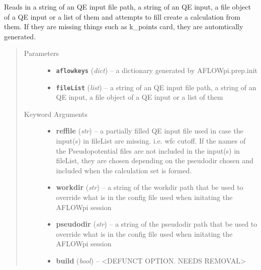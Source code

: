 \documentclass[letterpaper,10pt,english]{sphinxmanual}
\begin{document}
\begin{fulllineitems}
\label{prep:prep.calcFromFile}
Reads in a string of an QE input file path, a string of an QE input, a file object of a
QE input or a list of them and attempts to fill create a calculation from them. If they
are missing things such as k\_points card, they are automtically generated.
\begin{quote}\begin{description}
\item[{Parameters}] \leavevmode\begin{itemize}
\item {} 
\textbf{\texttt{aflowkeys}} (\emph{dict}) -- a dictionary generated by AFLOWpi.prep.init

\item {} 
\textbf{\texttt{fileList}} (\emph{list}) -- a string of an QE input file path, a string of an QE input, a file
object of a QE input or a list of them

\end{itemize}

\item[{Keyword Arguments}] \leavevmode\begin{itemize}
\item {} 
\textbf{reffile} (\emph{str}) --
a partially filled QE input file used in case the input(s) in fileList
are missing. i.e. wfc cutoff. If the names of the Pseudopotential files
are not included in the input(s) in fileList, they are chosen depending
on the pseudodir chosen and included when the calculation set is formed.

\item {} 
\textbf{workdir} (\emph{str}) --
a string of the workdir path that be used to override what is in the
config file used when initating the AFLOWpi session

\item {} 
\textbf{pseudodir} (\emph{str}) --
a string of the pseudodir path that be used to override what is in
the config file used when initating the AFLOWpi session

\item {} 
\textbf{build} (\emph{bool}) --
\textless{}DEFUNCT OPTION. NEEDS REMOVAL\textgreater{}

\end{itemize}

\end{description}\end{quote}

\end{fulllineitems}
\end{document}
